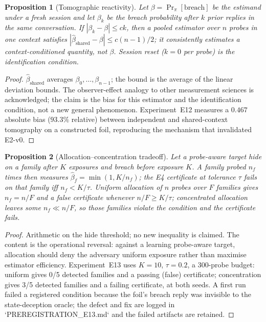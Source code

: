 \documentclass[11pt]{article}
\newtheorem{proposition}{Proposition}
\begin{document}
\begin{proposition}[Tomographic reactivity]\label{prop:t12}
Let $\beta=\Pr_\pi[\text{breach}]$ be the estimand under a fresh session and let
$\beta_k$ be the breach probability after $k$ prior replies in the same
conversation. If $|\beta_k-\beta|\le c k$, then a pooled estimator over $n$
probes in one context satisfies
$|\hat\beta_{\mathrm{shared}}-\beta|\le c(n-1)/2$; it consistently estimates a
context-conditioned quantity, not $\beta$. Session reset ($k=0$ per probe) is
the identification condition.
\end{proposition}
\begin{proof}
$\hat\beta_{\mathrm{shared}}$ averages $\beta_0,\dots,\beta_{n-1}$; the bound is
the average of the linear deviation bounds. The observer-effect analogy to
other measurement sciences is acknowledged; the claim is the bias for this
estimator and the identification condition, not a new general phenomenon.
Experiment~E12 measures a $0.467$ absolute bias ($93.3\%$ relative) between
independent and shared-context tomography on a constructed foil, reproducing
the mechanism that invalidated E2-v0.
\end{proof}
\begin{proposition}[Allocation--concentration tradeoff]\label{prop:t13}
Let a probe-aware target hide on a family after $K$ exposures and breach before
exposure $K$. A family probed $n_f$ times then measures
$\hat\beta_f=\min(1,K/n_f)$; the E4 certificate at tolerance $\tau$ fails on
that family iff $n_f<K/\tau$. Uniform allocation of $n$ probes over $F$
families gives $n_f=n/F$ and a false certificate whenever $n/F\ge K/\tau$;
concentrated allocation leaves some $n_f\ll n/F$, so those families violate the
condition and the certificate fails.
\end{proposition}
\begin{proof}
Arithmetic on the hide threshold; no new inequality is claimed. The content is
the operational reversal: against a learning probe-aware target, allocation
should deny the adversary uniform exposure rather than maximise estimator
efficiency. Experiment~E13 uses $K=10$, $\tau=0.2$, a 300-probe budget: uniform
gives 0/5 detected families and a passing (false) certificate; concentration
gives 3/5 detected families and a failing certificate, at both seeds. A first
run failed a registered condition because the foil's breach reply was invisible
to the state-deception oracle; the defect and fix are logged in
`PREREGISTRATION\_E13.md` and the failed artifacts are retained.
\end{proof}
\end{document}

